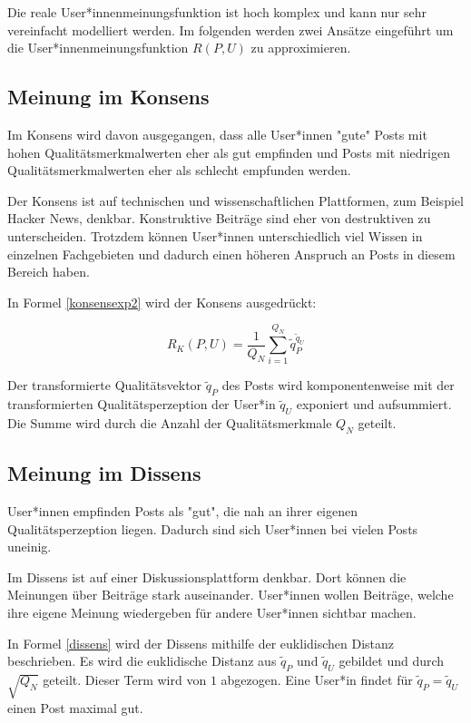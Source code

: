 Die reale User*innenmeinungsfunktion ist hoch komplex und kann nur sehr vereinfacht modelliert werden.
Im folgenden werden zwei Ansätze eingeführt um die User*innenmeinungsfunktion $R(P,U)$ zu approximieren.
 
\subsection{Meinung im Konsens}

Im Konsens wird davon ausgegangen, dass alle User*innen "gute" Posts mit hohen Qualitätsmerkmalwerten eher als gut empfinden und Posts mit niedrigen Qualitätsmerkmalwerten eher als schlecht empfunden werden.

Der Konsens ist auf technischen und wissenschaftlichen Plattformen, zum Beispiel Hacker News, denkbar. Konstruktive Beiträge sind eher von destruktiven zu unterscheiden. Trotzdem können User*innen unterschiedlich viel Wissen in einzelnen Fachgebieten und dadurch einen höheren Anspruch an Posts in diesem Bereich haben.  

In Formel \ref{konsensexp2} wird der Konsens ausgedrückt: 

\begin{equation}
\label{konsensexp2}
R_K(P,U) = \frac{1}{Q_N}\sum_{i = 1}^{Q_N}\tilde{q}_{P}^{\tilde{q}_{U}}
\end{equation}

Der transformierte Qualitätsvektor $\tilde{q}_P$ des Posts wird komponentenweise mit der transformierten Qualitätsperzeption der User*in $\tilde{q}_U$ exponiert und aufsummiert. Die Summe wird durch die Anzahl der Qualitätsmerkmale $Q_N$ geteilt.


\subsection{Meinung im Dissens}

User*innen empfinden Posts als "gut", die nah an ihrer eigenen Qualitätsperzeption liegen. Dadurch sind sich User*innen bei vielen Posts uneinig.

Im Dissens ist auf einer Diskussionsplattform denkbar. Dort können die Meinungen über Beiträge stark auseinander. User*innen wollen Beiträge, welche ihre eigene Meinung wiedergeben für andere User*innen sichtbar machen.

In Formel \ref{dissens} wird der Dissens mithilfe der euklidischen Distanz beschrieben. Es wird die euklidische Distanz aus $\tilde{q}_P$ und $\tilde{q}_U$ gebildet und durch $\sqrt{Q_N}$ geteilt. Dieser Term wird von $1$ abgezogen. Eine User*in findet für $\tilde{q}_P = \tilde{q}_U$ einen Post maximal gut.


